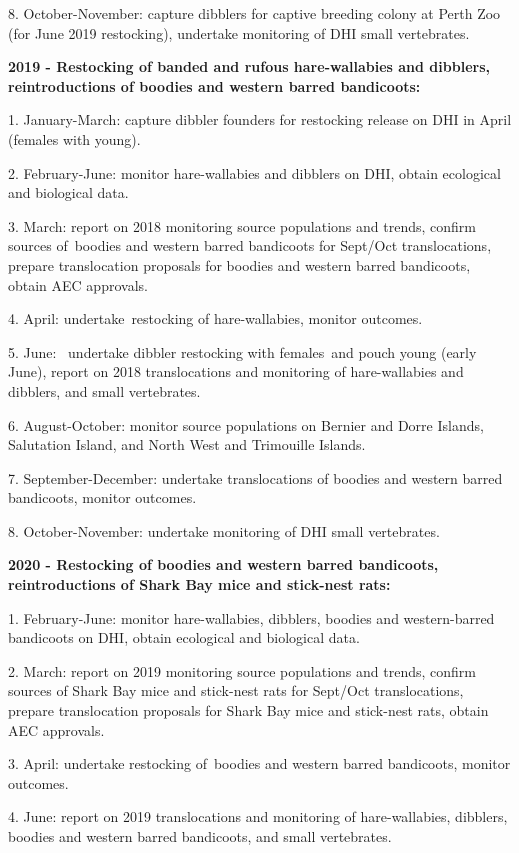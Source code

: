 \documentclass[version=last,
    paper=a4,                               %
    10pt,                                   %
    dvipsnames,
    oneside,                              %
    headings=openany,                       %
    open=any,
    BCOR=7mm,                               %
    DIV=15,     %
]{scrbook}
\begin{document}
8. October-November: capture dibblers for captive breeding colony at
Perth Zoo (for June 2019 restocking), undertake monitoring of DHI small
vertebrates.

\textbf{2019 - Restocking of banded and rufous hare-wallabies and
dibblers, reintroductions of boodies and western barred bandicoots:~}

1. January-March: capture dibbler founders for restocking release on DHI
in April (females with young).

2. February-June: monitor hare-wallabies and dibblers on DHI, obtain
ecological and biological data.

3. March: report on 2018 monitoring source populations and trends,
confirm sources of~boodies and western barred bandicoots for Sept/Oct
translocations, prepare translocation proposals for boodies and western
barred bandicoots, obtain AEC approvals.

4. April: undertake~restocking of hare-wallabies, monitor outcomes.

5. June:~ undertake dibbler restocking with females~and pouch young
(early June), report on 2018 translocations and monitoring of
hare-wallabies and dibblers, and small vertebrates.

6. August-October: monitor source populations on Bernier and Dorre
Islands, Salutation Island, and North West and Trimouille Islands.

7. September-December: undertake translocations of boodies and western
barred bandicoots, monitor outcomes.

8. October-November: undertake monitoring of DHI small vertebrates.

\textbf{2020 - Restocking of boodies and western barred bandicoots,
reintroductions of Shark Bay mice and stick-nest rats:}

1. February-June: monitor hare-wallabies, dibblers, boodies and
western-barred bandicoots on DHI, obtain ecological and biological data.

2. March: report on 2019 monitoring source populations and trends,
confirm sources of Shark Bay mice and stick-nest rats for Sept/Oct
translocations, prepare translocation proposals for Shark Bay mice and
stick-nest rats, obtain AEC approvals.

3. April: undertake restocking of~boodies and western barred bandicoots,
monitor outcomes.

4. June: report on 2019 translocations and monitoring of hare-wallabies,
dibblers, boodies and western barred bandicoots, and small vertebrates.
\end{document}
